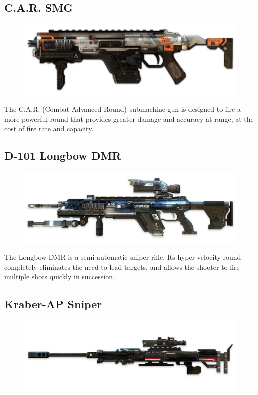 \documentclass[9pt, openany]{extbook}
\begin{document}
\subsection{C.A.R. SMG}
\begin{figure}
\vspace*{-2em}
\includegraphics[width=\linewidth]{CARSMG}
\end{figure}

The C.A.R. (Combat Advanced Round) submachine gun is designed to fire a more powerful round that provides greater damage and accuracy at range, at the cost of fire rate and capacity.


\subsection{D-101 Longbow DMR}
\begin{figure}
\vspace*{-2em}
\includegraphics[width=\linewidth]{LongbowDMRSniper}
\end{figure}

The Longbow-DMR is a semi-automatic sniper rifle. Its hyper-velocity round completely eliminates the need to lead targets, and allows the shooter to fire multiple shots quickly in succession.


\subsection{Kraber-AP Sniper}
\begin{figure}
\vspace*{-2em}
\includegraphics[width=\linewidth]{KraberAPSniper}
\end{figure}
\end{document}
